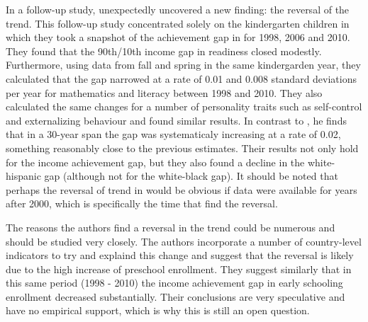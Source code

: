 \documentclass[11pt, a4paper]{article}\usepackage[]{graphicx}\usepackage[]{color}
\begin{document}
In a follow-up study, \citet{reardon_portilla} unexpectedly uncovered a new finding: the reversal of the trend. This follow-up study concentrated solely on the kindergarten children in which they took a snapshot of the achievement gap in for 1998, 2006 and 2010. They found that the 90th/10th income gap in readiness closed modestly. Furthermore, using data from fall and spring in the same kindergarden year, they calculated that the gap narrowed at a rate of 0.01 and 0.008 standard deviations per year for mathematics and literacy between 1998 and 2010. They also calculated the same changes for a number of personality traits such as self-control and externalizing behaviour and found similar results. In contrast to \citet{reardon2011}, he finds that in a 30-year span the gap was systematicaly increasing at a rate of 0.02, something reasonably close to the previous estimates. Their results not only hold for the income achievement gap, but they also found a decline in the white-hispanic gap (although not for the white-black gap). It should be noted that perhaps the reversal of trend in \citet{reardon2011} would be obvious if data were available for years after 2000,  which is specifically the time that \citet{reardon_portilla} find the reversal.

The reasons the authors find a reversal in the trend could be numerous and should be studied very closely. The authors incorporate a number of country-level indicators to try and explaind this change and suggest that the reversal is likely due to the high increase of preschool enrollment. They suggest similarly that in this same period (1998 - 2010) the income achievement gap in early schooling enrollment decreased substantially. Their conclusions are very speculative and have no empirical support, which is why this is still an open question.
\end{document}

